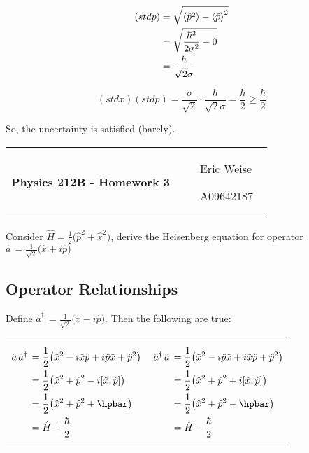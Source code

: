 \documentclass{article}
\newcommand{\assignment}[1]{
    \newpage
    \begin{tabular}{p{0.65\linewidth}p{0.25\linewidth}}
        {\bf\LARGE Physics 212B - Homework #1 }
        &
        \parbox[b]{0.24\textwidth}{
            \hfill Eric Weise

            \hfill A09642187
            }
    \end{tabular}
    \vspace{12pt}
    \newline
}
\renewcommand{\exp}[1]{\,\text{exp} \big\{ #1 \big\} }
\begin{document}
\begin{align*}
    (stdp) 
    &= \sqrt{\braket{\hat{p}^2} - \braket{\hat{p}}^2} \\
    &= \sqrt{\frac{\hbar^2}{2\sigma^2} - 0} \\
    &= \frac{\hbar}{\sqrt{2}\sigma}
\end{align*}

\[ (stdx)(stdp)
    = \frac{\sigma}{\sqrt{2}} \cdot \frac{\hbar}{\sqrt{2}\sigma}
    = \frac{\hbar}{2} 
    \ge \frac{\hbar}{2} \]

So, the uncertainty is satisfied (barely).


\assignment{3}
\renewcommand{\exp}[1]{ \, e^{#1} \, }
\newcommand{\aop}[0]{ \hat{a} \, }
\newcommand{\adagger}[0]{ \hat{a}^{\dagger} \, }

Consider
\( \hat{H} = \frac{1}{2}\big(\hat{p}^2 + \hat{x}^2\big) \),
derive the Heisenberg equation for operator
\( \aop = \frac{1}{\sqrt{2}} \big( \hat{x} + i \hat{p} \big) \)

 \subsection*{Operator Relationships}
 Define 
 \( \adagger = \frac{1}{\sqrt{2}} \big( \hat{x} - i \hat{p} \big)\).
 Then the following are true:

 \begin{tabular}{cc}
     \parbox[b]{0.45\textwidth}{
         \begin{align*}
             \aop\adagger
             &= \frac{1}{2} \big( \hat{x}^2 - i \hat{x}\hat{p} + i \hat{p}\hat{x} + \hat{p}^2 \big) \\
             &= \frac{1}{2} \big( \hat{x}^2  + \hat{p}^2 -i [\hat{x},\hat{p}] \big) \\
             &= \frac{1}{2} \big( \hat{x}^2  + \hat{p}^2 + \hpbar \big) \\
             &= \hat{H} + \frac{\hbar}{2} \\
         \end{align*}
     }
    &
    \parbox[b]{0.45\textwidth}{ 
         \begin{align*}
             \adagger\aop
             &= \frac{1}{2} \big( \hat{x}^2 - i \hat{p}\hat{x} + i \hat{x}\hat{p} + \hat{p}^2 \big) \\
             &= \frac{1}{2} \big( \hat{x}^2  + \hat{p}^2 +i [\hat{x},\hat{p}] \big) \\
             &= \frac{1}{2} \big( \hat{x}^2  + \hat{p}^2 - \hpbar \big) \\
             &= \hat{H} - \frac{\hbar}{2} \\
         \end{align*}
     }
 \end{tabular}
\end{document}
